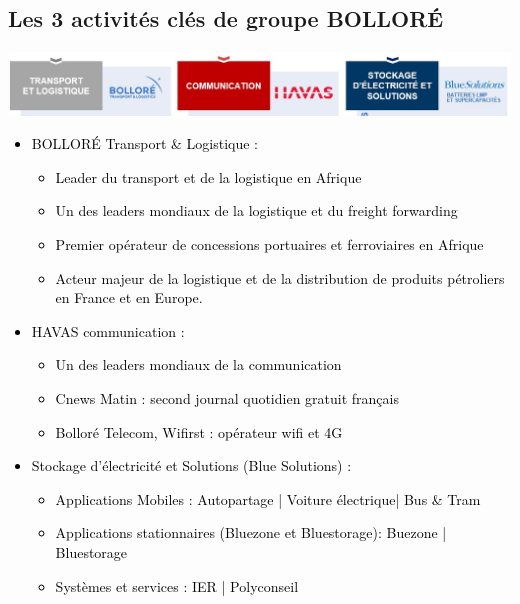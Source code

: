 \subsection{Les 3 activités clés de groupe BOLLORÉ}

	\begin{center}
		\includegraphics[width=1\linewidth]{images_BOLLORE/activite_bollore}
	\end{center}
	
\textcolor{black}{

\begin{itemize}
	\item	BOLLORÉ Transport & Logistique : 
\begin{itemize}
	\item Leader du transport et de la logistique en Afrique 
	\item Un des leaders mondiaux de la logistique et du freight forwarding
	\item Premier opérateur de concessions portuaires et ferroviaires en Afrique
	\item Acteur majeur de la logistique et de la distribution de produits pétroliers en France et en Europe. 
\end{itemize}

\item	HAVAS communication : 
\begin{itemize}
	\item Un des leaders mondiaux de la communication 
	\item Cnews Matin : second journal quotidien gratuit français 
	\item Bolloré Telecom, Wifirst : opérateur wifi et 4G	
\end{itemize}

\item	Stockage d’électricité et Solutions (Blue Solutions) : 
\begin{itemize}
	\item Applications Mobiles : Autopartage | Voiture électrique| Bus & Tram
	\item Applications stationnaires (Bluezone et Bluestorage): Buezone | Bluestorage
	\item Systèmes et services : IER | Polyconseil 
\end{itemize}
\end{itemize}
}

